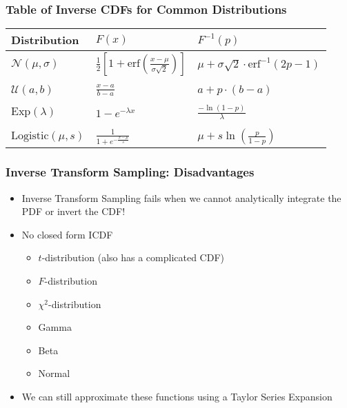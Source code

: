\documentclass{beamer}
\begin{document}
\begin{frame}
\frametitle{Table of Inverse CDFs for Common Distributions}
\begin{center}
\begin{tabular}{L{2cm}C{3.2cm}C{4.2cm}}
\toprule
{Distribution} & $F(x)$ & $F^{-1}(p)$ \\
\midrule
$\mathcal{N}(\mu, \sigma)$   & $\frac{1}{2} \left[ 1 + \text{erf} \left( \frac{x - \mu}{\sigma \sqrt{2}} \right) \right]$ & $\mu + \sigma \sqrt{2} \cdot \text{erf}^{-1}\left( 2p - 1 \right)$ \\
\\
$\mathcal{U}(a, b)$       & $\frac{x - a}{b - a}$ & $a + p \cdot \left( b - a \right)$ \\
\\
$\text{Exp}(\lambda)$        & $1 - e^{-\lambda x}$  & $\frac{- \ln \left( 1 - p \right)}{\lambda}$ \\
\\
$\text{Logistic}(\mu, s)$    & $\frac{1}{1+e^{-\frac{x-\mu}{s}}}$ & $\mu + s \ln \left( \frac{p}{1-p} \right)$\\
\bottomrule
\end{tabular}
\end{center}
\end{frame}

\begin{frame}
  \frametitle{Inverse Transform Sampling: Disadvantages}
  \begin{itemize}
    \item Inverse Transform Sampling fails when we cannot analytically integrate the PDF or invert the CDF!
    \item No closed form ICDF
    \begin{itemize}
      \item $t$-distribution (also has a complicated CDF)
      \item $F$-distribution
      \item $\chi^2$-distribution
      \item Gamma
      \item Beta
      \item Normal
    \end{itemize}
    \item We can still approximate these functions using a Taylor Series Expansion
  \end{itemize}
\end{frame}
\end{document}
